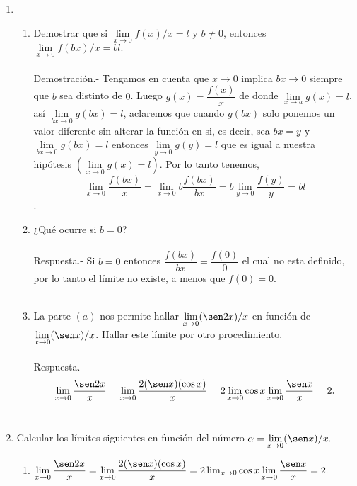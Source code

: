\begin{enumerate}
\item 
\begin{enumerate}[\bfseries (a)]

    \item Demostrar que si $\lim\limits_{x\to 0} f(x)/x = l$ y $b\neq 0$, entonces $\lim\limits_{x\to 0} f(bx)/x = bl.$\\\\
	Demostración.-\; Tengamos en cuenta que ${x\to 0}$ implica ${bx\to 0}$ siempre que $b$ sea distinto de $0$. Luego $g(x)=\dfrac{f(x)}{x}$ de donde $\lim\limits_{x\to a} g(x) = l$, así $\lim\limits_{bx\to 0} g(bx) = l$, aclaremos que cuando $g(bx)$ solo ponemos un valor diferente sin alterar la función en si, es decir, sea $bx=y$ y $\lim\limits_{bx\to 0} g(bx) = l$ entonces $\lim\limits_{y \to 0} g(y) = l$ que es igual a nuestra hipótesis $\left(\lim\limits_{x\to 0} g(x) = l\right)$.
	Por lo tanto tenemos,
	$$\lim_{x\to 0} \dfrac{f(bx)}{x} = \lim_{x\to 0} b\dfrac{f(bx)}{bx} = b\lim_{y\to 0} \dfrac{f(y)}{y} = bl$$.\\

    \item ¿Qué ocurre si $b=0$?\\\\
	Respuesta.-\; Si $b=0$ entonces $\dfrac{f(bx)}{bx} = \dfrac{f(0)}{0} $ el cual no esta definido, por lo tanto el límite no existe, a menos que $f(0) = 0$.\\\\

    \item La parte $(a)$ nos permite hallar $\lim\limits_{x\to 0}(\sen 2x)/x$ en función de $\lim\limits_{x\to 0} (\sen x)/x$. Hallar este límite por otro procedimiento.\\\\
	Respuesta.-\; $$\lim_{x\to 0} \dfrac{\sen 2x}{x} = \lim_{x\to 0}\dfrac{2(\sen x)(\cos x)}{x} = 2 \lim_{x\to 0} \cos x \lim_{x\to 0} \dfrac{\sen x}{x} = 2.$$\\

\end{enumerate}

\item Calcular los límites siguientes en función del número $\alpha = \lim\limits_{x\to 0} (\sen x)/x.$
\begin{enumerate}[\bfseries (i)]

    \item $\lim\limits_{x\to 0} \dfrac{\sen 2x}{x} = \lim\limits_{x\to 0}\dfrac{2(\sen x)(\cos x)}{x} = 2 \lim_{x\to 0} \cos x \lim\limits_{x\to 0} \dfrac{\sen x}{x} = 2.$\\\\


\end{enumerate}
\end{enumerate}
